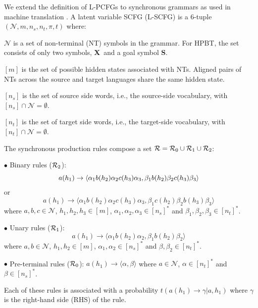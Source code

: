 \documentclass[11pt]{article}
\newcommand{\rules}{{\cal R}}
\newcommand{\bS}{{\bf S}}
\newcommand{\bX}{{\bf X}}
\newenvironment{itemizesquish}{\begin{list}{\setcounter{enumi}{0}\labelitemi}{\setlength{\itemsep}{-0.25em}\setlength{\labelwidth}{0.5em}\setlength{\leftmargin}{\labelwidth}\addtolength{\leftmargin}{\labelsep}}}{\end{list}}
\newcommand{\shaycomment}[1]{\textcolor{blue}{#1 -- Shay}}
\begin{document}
We extend the definition of L-PCFGs \cite{Matsuzaki2005,Petrov2006} to synchronous grammars as used in machine translation \cite{Chiang2007}. 
A latent variable SCFG (L-SCFG) is a 6-tuple $(\mathcal{N}, m, n_s, n_t, \pi, t)$ where: 
\begin{itemizesquish}
  \item $\mathcal{N}$ is a set of non-terminal (NT) symbols in the grammar.  
  	For HPBT, the set consists of only two symbols, \bX~and a goal symbol \bS.  
  \item $[m]$ is the set of possible hidden states associated with NTs.  
  	Aligned pairs of NTs across the source and target languages share the same hidden state.
   \item $[n_s]$ is the set of source side words, i.e., the source-side vocabulary, with $[n_s] \cap \mathcal{N} = \emptyset$.
   \item $[n_t]$ is the set of target side words, i.e., the target-side vocabulary, with $[n_t] \cap \mathcal{N} = \emptyset$.
   \item The synchronous production rules compose a set $\rules = \rules_0 \cup \rules_1 \cup \rules_2$:
   
$\bullet$ Binary rules ($\rules_2$): $$a(h_1) \rightarrow \langle \alpha_1b(h_2)\alpha_2c(h_3)\alpha_3, \newline \beta_1b(h_2)\beta_2c(h_3)\beta_3 \rangle$$ or $$a(h_1) \rightarrow \langle \alpha_1 b(h_2) \alpha_2 c(h_3) \alpha_3, \beta_1 c(h_2) \beta_2 b(h_3) \beta_3 \rangle$$ where $a,b,c \in \mathcal{N}$, $h_1,h_2,h_3 \in [m]$, $\alpha_1,\alpha_2,\alpha_3 \in [n_s]^{\ast}$ and $\beta_1,\beta_2,\beta_3 \in [n_t]^{\ast}$.

$\bullet$ Unary rules ($\rules_1$): $$a(h_1) \rightarrow \langle \alpha_1 b(h_2) \alpha_2, \beta_1 b(h_2) \beta_2\rangle$$ where $a,b \in \mathcal{N}$, $h_1,h_2 \in [m]$, $\alpha_1,\alpha_2 \in [n_s]^{\ast}$ and $\beta,\beta_2 \in [n_t]^{\ast}$. 

$\bullet$ Pre-terminal rules ($\rules_0$): $a(h_1) \rightarrow \langle \alpha, \beta \rangle$ where $a \in \mathcal{N}$, $\alpha \in [n_t]^{\ast}$ and $\beta \in [n_s]^{\ast}$.

Each of these rules is associated with a probability $t(a(h_1) \rightarrow \gamma | a, h_1)$ where $\gamma$ is the right-hand side (RHS) of the rule.


\end{itemizesquish}
\end{document}
